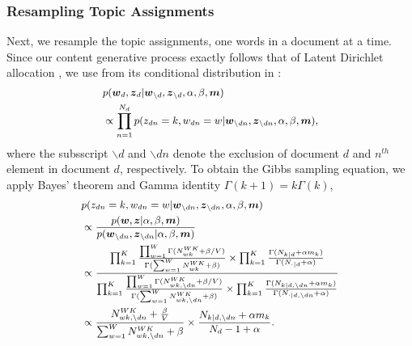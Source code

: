 \documentclass[twoside]{article}
\begin{document}
  	  \subsubsection{Resampling Topic Assignments}  \label{subsubsec: Resampling Z}
Next, we resample the topic assignments, one words in a document at a time. Since our content generative process exactly follows that of Latent Dirichlet allocation \citep{Blei2003}, we use 
 \iffalse from its conditional distribution in :
  	  \begin{equation*}
  	    	 \footnotesize
  	  \begin{aligned}
  	  & p(\boldsymbol{w}_{d}, \boldsymbol{z}_{d}|\boldsymbol{w}_{\backslash d}, \boldsymbol{z}_{\backslash d},\alpha,  \beta, \boldsymbol{m}) \\& \propto \prod_{n=1}^{{N_d}}p(z_{dn}=k, w_{dn}=w| \boldsymbol{w}_{\backslash dn}, \boldsymbol{z}_{\backslash dn},\alpha,  \beta, \boldsymbol{m}),
  	  \end{aligned}
  	  \end{equation*}
  	  where the subsscript $\backslash d$ and $\backslash dn$ denote the exclusion of document $d$ and $n^{th}$ element in document $d$, respectively.  
  	  To obtain the Gibbs sampling equation, we apply Bayes' theorem and Gamma identity $\Gamma(k+1)=k\Gamma(k)$,
  	  \begin{equation*}
  	    	 \footnotesize
  	  \begin{aligned}
  	  & p(z_{dn}=k, w_{dn}=w| \boldsymbol{w}_{\backslash dn}, \boldsymbol{z}_{\backslash dn},\alpha,  \beta, \boldsymbol{m})\\& \propto 
  	  \frac{p(\boldsymbol{w},\boldsymbol{z}|\alpha, \beta, \boldsymbol{m})}{p(\boldsymbol{w}_{\backslash dn}, \boldsymbol{z}_{\backslash dn}|\alpha, \beta, \boldsymbol{m})}\\& \propto \frac{\prod_{k=1}^{K}\frac{\prod_{w=1}^W\Gamma(N_{wk}^{WK}+\beta/V)}{\Gamma(\sum_{w=1}^WN_{wk}^{WK}+\beta )}\times\prod_{k=1}^K\frac{\Gamma(N_{k|d}+\alpha m_k)}{\Gamma(N_{\cdot|d}+\alpha)}}{\prod_{k=1}^{K}\frac{\prod_{w=1}^W\Gamma(N_{wk, \backslash dn}^{WK}+\beta/V)}{\Gamma(\sum_{w=1}^WN_{wk, \backslash dn}^{WK}+\beta )}\times\prod_{k=1}^K\frac{\Gamma(N_{k|d, \backslash dn}+\alpha m_k)}{\Gamma(N_{\cdot|d, \backslash dn}+\alpha)}}\\ & \propto 
  	  \frac{N_{wk, \backslash dn}^{WK}+\frac{\beta}{V}}{\sum_{w=1}^WN_{wk,  \backslash dn}^{WK}+\beta}\times\frac{N_{k|d, \backslash dn}+\alpha m_k}{N_d-1+\alpha}.
  	  \end{aligned}
  	  \end{equation*}
\end{document}
